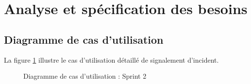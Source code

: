 \section{Analyse et spécification des besoins}

\subsection{Diagramme de cas d'utilisation}
La figure \ref{fig:uc_sprint2} illustre le cas d'utilisation détaillé de signalement d'incident.

\begin{figure}[H]
    \centering
    \caption{Diagramme de cas d'utilisation : Sprint 2}
    \label{fig:uc_sprint2}
\end{figure}

